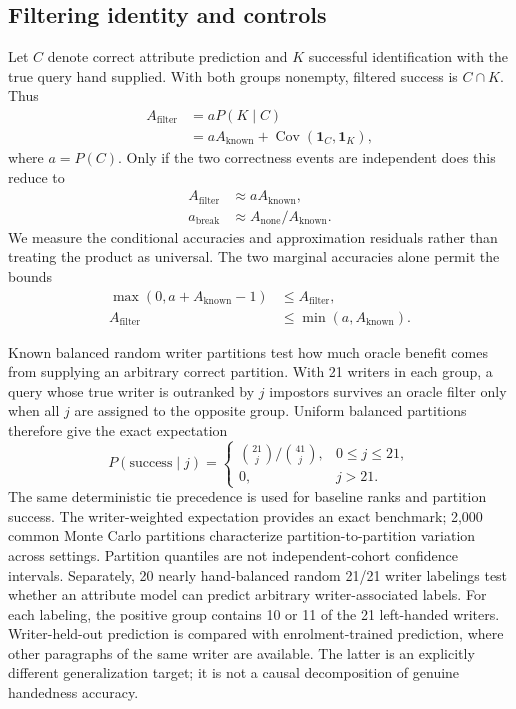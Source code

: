 \documentclass[ASNA,twocolumn]{USG}
\begin{document}
\subsection{Filtering identity and controls}
\label{sec:identity}
Let $C$ denote correct attribute prediction and $K$ successful identification with the true query hand supplied. With both groups nonempty, filtered success is $C\cap K$. Thus
\begin{align}
 A_{\mathrm{filter}}&=aP(K\mid C)\nonumber\\
 &=aA_{\mathrm{known}}+\operatorname{Cov}(\mathbf1_C,\mathbf1_K),
 \label{eq:exact}
\end{align}
where $a=P(C)$. Only if the two correctness events are independent does this reduce to
\begin{equation}
 \begin{aligned}
 A_{\mathrm{filter}}&\approx aA_{\mathrm{known}},\\
 a_{\mathrm{break}}&\approx A_{\mathrm{none}}/A_{\mathrm{known}}.
 \end{aligned}
 \label{eq:approx}
\end{equation}
We measure the conditional accuracies and approximation residuals rather than treating the product as universal. The two marginal accuracies alone permit the bounds
\begin{equation}
 \begin{aligned}
 \max(0,a+A_{\mathrm{known}}-1)&\leq A_{\mathrm{filter}},\\
 A_{\mathrm{filter}}&\leq\min(a,A_{\mathrm{known}}).
 \end{aligned}
 \label{eq:bounds}
\end{equation}

Known balanced random writer partitions test how much oracle benefit comes from supplying an arbitrary correct partition. With 21 writers in each group, a query whose true writer is outranked by $j$ impostors survives an oracle filter only when all $j$ are assigned to the opposite group. Uniform balanced partitions therefore give the exact expectation
\begin{equation}
P(\mathrm{success}\mid j)=\begin{cases}\binom{21}{j}/\binom{41}{j},&0\leq j\leq21,\\0,&j>21.\end{cases}
\label{eq:randompartition}
\end{equation}
The same deterministic tie precedence is used for baseline ranks and partition success. The writer-weighted expectation provides an exact benchmark; 2,000 common Monte Carlo partitions characterize partition-to-partition variation across settings. Partition quantiles are not independent-cohort confidence intervals. Separately, 20 nearly hand-balanced random 21/21 writer labelings test whether an attribute model can predict arbitrary writer-associated labels. For each labeling, the positive group contains 10 or 11 of the 21 left-handed writers. Writer-held-out prediction is compared with enrolment-trained prediction, where other paragraphs of the same writer are available. The latter is an explicitly different generalization target; it is not a causal decomposition of genuine handedness accuracy.
\end{document}
